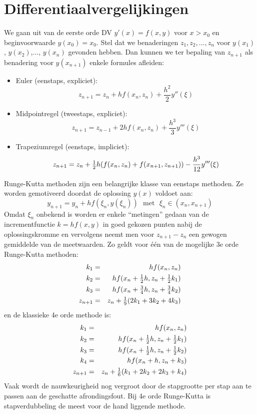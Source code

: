 \documentclass[twoside]{report}
\begin{document}
\section{Differentiaalvergelijkingen}
We gaan uit van de eerste orde DV $y'(x)=f(x,y)$ voor $x>x_0$ en beginvoorwaarde
$y(x_0)=x_0$. Stel dat we benaderingen $z_1,z_2,...,z_n$ voor $y(x_1)$,
$y(x_2)$,..., $y(x_n)$ gevonden hebben. Dan kunnen we ter bepaling van
$z_{n+1}$ als benadering voor $y(x_{n+1})$ enkele formules afleiden:
\begin{itemize}
\item Euler (eenstaps, expliciet):
\[
z_{n+1}=z_n+hf(x_n,z_n)+\frac{h^2}{2}y''(\xi)
\]
\item Midpointregel (tweestaps, expliciet):
\[
z_{n+1}=z_{n-1}+2hf(x_n,z_n)+\frac{h^3}{3}y'''(\xi)
\]
\item Trapeziumregel (eenstaps, impliciet):
\[
z_{n+1}=z_n+\mbox{$\frac{1}{2}$} h(f(x_n,z_n)+f(x_{n+1},z_{n+1}))-\frac{h^3}{12}y'''(\xi)
\]
\end{itemize}
Runge-Kutta methoden zijn een belangrijke klasse van eenstaps methoden. Ze
worden gemotiveerd doordat de oplossing $y(x)$ voldoet aan:
\[
y_{n+1}=y_n+hf(\xi_n,y(\xi_n))~~~\mbox{met}~~~\xi_n\in(x_n,x_{n+1})
\]
Omdat $\xi_n$ onbekend is worden er enkele ``metingen'' gedaan van de
incrementfunctie $k=hf(x,y)$ in goed gekozen punten nabij de oplossingskromme
en vervolgens neemt men voor $z_{n+1}-z_n$ een gewogen gemiddelde van de
meetwaarden. Zo geldt voor \'e\'en van de mogelijke 3e orde Runge-Kutta methoden:
\begin{eqnarray*}
k_1&=&hf(x_n,z_n)\\
k_2&=&hf(x_n+\mbox{$\frac{1}{2}$} h,z_n+\mbox{$\frac{1}{2}$} k_1)\\
k_3&=&hf(x_n+\mbox{$\frac{3}{4}$}h,z_n+\mbox{$\frac{3}{4}$}k_2)\\
z_{n+1}&=&z_n+\mbox{$\frac{1}{9}$}(2k_1+3k_2+4k_3)
\end{eqnarray*}
en de klassieke 4e orde methode is:
\begin{eqnarray*}
k_1&=&hf(x_n,z_n)\\
k_2&=&hf(x_n+\mbox{$\frac{1}{2}$} h,z_n+\mbox{$\frac{1}{2}$} k_1)\\
k_3&=&hf(x_n+\mbox{$\frac{1}{2}$} h,z_n+\mbox{$\frac{1}{2}$} k_2)\\
k_4&=&hf(x_n+h,z_n+k_3)\\
z_{n+1}&=&z_n+\mbox{$\frac{1}{6}$}(k_1+2k_2+2k_3+k_4)
\end{eqnarray*}
Vaak wordt de nauwkeurigheid nog vergroot door de stapgrootte per stap aan
te passen aan de geschatte afrondingsfout. Bij 4e orde Runge-Kutta is
stapverdubbeling de meest voor de hand liggende methode.
\end{document}
